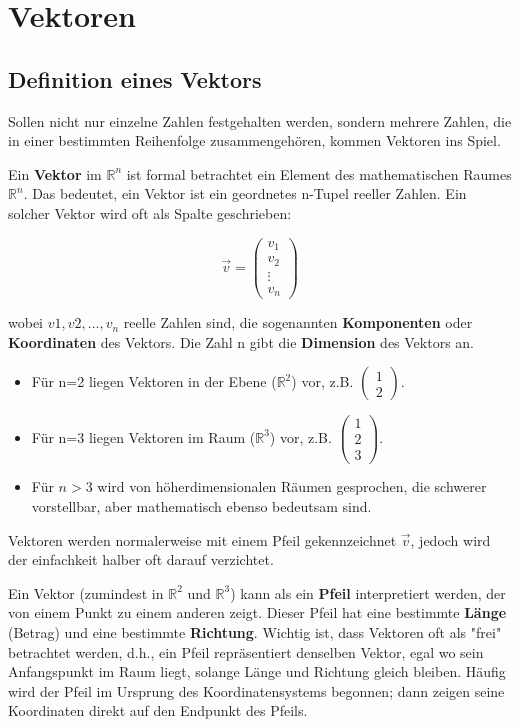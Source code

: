 \chapter{Vektoren}

\section{Definition eines Vektors}

Sollen nicht nur einzelne Zahlen festgehalten werden, sondern mehrere Zahlen, die in einer bestimmten Reihenfolge zusammengehören, kommen Vektoren ins Spiel.

Ein \textbf{Vektor} im $\mathbb{R}^n$ ist formal betrachtet ein Element des mathematischen Raumes $\mathbb{R}^n$. Das bedeutet, ein Vektor ist ein geordnetes n-Tupel reeller Zahlen. Ein solcher Vektor wird oft als Spalte geschrieben:

\[
\vec{v} = \begin{pmatrix}
    v_1 \\ v_2 \\ \vdots \\ v_n
\end{pmatrix}
\]

wobei $v1, v2, \dots, v_n$ reelle Zahlen sind, die sogenannten \textbf{Komponenten} oder \textbf{Koordinaten} des Vektors. Die Zahl n gibt die \textbf{Dimension} des Vektors an.

\begin{itemize}
    \item Für n=2 liegen Vektoren in der Ebene ($\mathbb{R}^2$) vor, z.B. $\begin{pmatrix}
        1 \\ 2
    \end{pmatrix}$.
    \item Für n=3 liegen Vektoren im Raum ($\mathbb{R}^3$) vor, z.B. $\begin{pmatrix}
        1 \\ 2 \\ 3
    \end{pmatrix}$.
    \item Für $n > 3$ wird von höherdimensionalen Räumen gesprochen, die schwerer vorstellbar, aber mathematisch ebenso bedeutsam sind.
\end{itemize}

Vektoren werden normalerweise mit einem Pfeil gekennzeichnet $\vec{v}$, jedoch wird der einfachkeit halber oft darauf verzichtet.

Ein Vektor (zumindest in $\mathbb{R}^2$ und $\mathbb{R}^3$) kann als ein \textbf{Pfeil} interpretiert werden, der von einem Punkt zu einem anderen zeigt. Dieser Pfeil hat eine bestimmte \textbf{Länge} (Betrag) und eine bestimmte \textbf{Richtung}. Wichtig ist, dass Vektoren oft als "frei" betrachtet werden, d.h., ein Pfeil repräsentiert denselben Vektor, egal wo sein Anfangspunkt im Raum liegt, solange Länge und Richtung gleich bleiben. Häufig wird der Pfeil im Ursprung des Koordinatensystems begonnen; dann zeigen seine Koordinaten direkt auf den Endpunkt des Pfeils.

